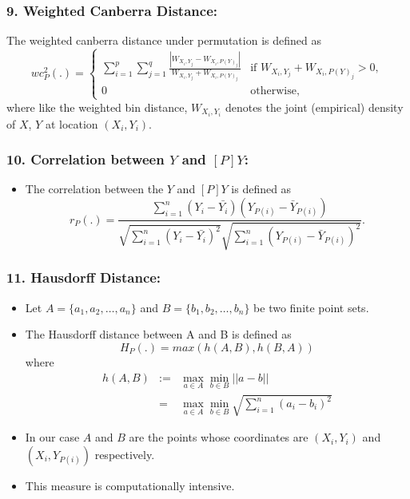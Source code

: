 \documentclass{beamer}
\begin{document}
\begin{frame}
\frametitle{9. Weighted Canberra Distance: }
The weighted canberra distance under permutation is defined as 
\[
wc_P^2(.) = \left \{ 
\begin{array}{ll}
\sum_{i=1}^p \sum_{j=1}^q \frac{ |W_{X_i,Y_j} - W_{X_i,P(Y)_j}|}{ W_{X_i,Y_j} + W_{X_i,P(Y)_j}} & \text{if } W_{X_i,Y_j} + W_{X_i,P(Y)_j} > 0,\\
0 & \text{otherwise},
\end{array} \right.
\] 
where like the weighted bin distance, $W_{X_i,Y_i}$ denotes the joint (empirical) density of $X$, $Y$ at location $(X_i, Y_i)$. 

\end{frame}

\begin{frame}
\frametitle{10. Correlation between $Y$ and $[P]Y$:}
\begin{itemize} 
\item The correlation between the $Y$ and $[P]Y$ is defined as
\[
r_P(.) = \frac{ \sum_{i=1}^n (Y_i - \bar{Y_i})(Y_{P(i)} - \bar{Y}_{P(i)})}{\sqrt{\sum_{i=1}^n (Y_i - \bar{Y_i})^2}\sqrt{\sum_{i=1}^n (Y_{P(i)}- \bar{Y}_{P(i)})^2}}.
\]
\end{itemize}
\end{frame}

\begin{frame}
\frametitle{11. Hausdorff Distance:}
\begin{itemize}
\item Let $A = \{a_1, a_2, \dots, a_n\}$ and $B = \{b_1, b_2, \dots, b_n\}$ be two finite point sets. 
\item The Hausdorff distance between A and B is defined as
 \[
H_P(.)  = max (h(A, B), h(B, A))
\]
where 
\begin{eqnarray*}
h(A, B) &:=& \max_{a \in A} \min_{b \in B} ||a - b|| \\ & = & \max_{a \in A} \min_{b \in B} \sqrt{\sum_{i=1}^n (a_i - b_i)^2}
\end{eqnarray*}
\item In our case $A$ and $B$ are the points whose coordinates are $(X_i, Y_i)$ and $(X_i, Y_{P(i)})$ respectively. 
\item This measure is computationally intensive.

\end{itemize}

\end{frame}
\end{document}
